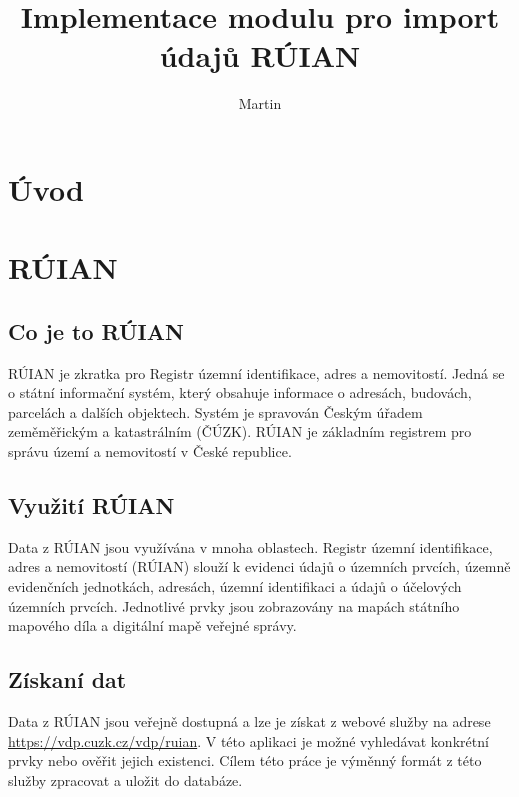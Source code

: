 \documentclass[czech, kiv, ba, he, iso690alph, pdf]{fasthesis}
\title{Implementace modulu pro import údajů RÚIAN}
\author{Martin}{Schön}
\begin{document}
\frontpages[tm]
\tableofcontents
\chapter{Úvod}

\chapter{RÚIAN}
\section{Co je to RÚIAN}
RÚIAN je zkratka pro Registr územní identifikace, adres a nemovitostí. 
Jedná se o státní informační systém, který obsahuje informace o adresách, budovách, parcelách a dalších objektech. 
Systém je spravován Českým úřadem zeměměřickým a katastrálním (ČÚZK). 
RÚIAN je základním registrem pro správu území a nemovitostí v České republice.

\section{Využití RÚIAN}
Data z RÚIAN jsou využívána v mnoha oblastech.
Registr územní identifikace, adres a nemovitostí (RÚIAN) slouží k evidenci údajů o územních prvcích, 
územně evidenčních jednotkách, adresách, územní identifikaci a údajů o účelových územních prvcích. 
Jednotlivé prvky jsou zobrazovány na mapách státního mapového díla a digitální mapě veřejné správy.

\section{Získaní dat}
Data z RÚIAN jsou veřejně dostupná a lze je získat z webové služby na adrese \url{https://vdp.cuzk.cz/vdp/ruian}.
V této aplikaci je možné vyhledávat konkrétní prvky nebo ověřit jejich existenci.
Cílem této práce je výměnný formát z této služby zpracovat a uložit do databáze.
\end{document}
